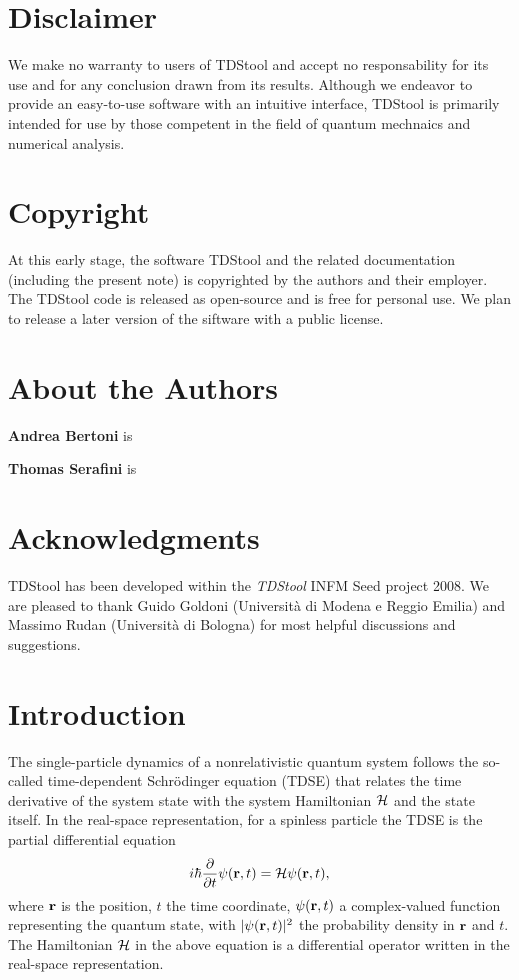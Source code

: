 \documentclass[a4paper,11pt]{article}
\begin{document}
\section*{Disclaimer}
We make no warranty to users of TDStool and accept no responsability for
its use and for any conclusion drawn from its results.  Although we endeavor
to provide an easy-to-use software with an intuitive interface, TDStool is
primarily intended for use by those competent in the field of quantum mechnaics
and numerical analysis.

\section*{Copyright}
At this early stage, the software TDStool and the related documentation
(including the present note) is copyrighted by the authors and their
employer.  The TDStool code is released as open-source and is free for
personal use.  We plan to release a later version of the siftware with a public
license.


\section*{About the Authors}

{\bf Andrea Bertoni} is

{\bf Thomas Serafini} is

\section*{Acknowledgments}
TDStool has been developed within the \emph{TDStool} INFM Seed project 2008.
We are pleased to thank Guido Goldoni (Universit\`a di Modena e Reggio Emilia)
and Massimo Rudan (Universit\`a di Bologna) for most helpful discussions and
suggestions.

\newpage

\tableofcontents

\newpage

\pagestyle{fancy}


\section{Introduction}
The single-particle dynamics of a nonrelativistic quantum system follows
the so-called time-dependent Schr\"odinger equation (TDSE) that relates the time derivative
of the system state with the system Hamiltonian ${\cal H}$ and the state itself.
In the real-space representation, for a spinless particle the TDSE is the partial differential equation 
\begin{equation} \label{tdse1}
i\hbar\frac{\partial}{\partial t}\psi({\bf r},t)= {\cal H} \psi({\bf r},t),
\end{equation}
where ${\bf r}$ is the position, $t$ the time coordinate, $\psi({\bf r},t)$ a complex-valued
function representing the quantum state, with $|\psi({\bf r},t)|^2$ the probability density in
${\bf r}$ and $t$.  The Hamiltonian ${\cal H}$ in the above
equation is a differential operator written in the real-space representation.
\end{document}
